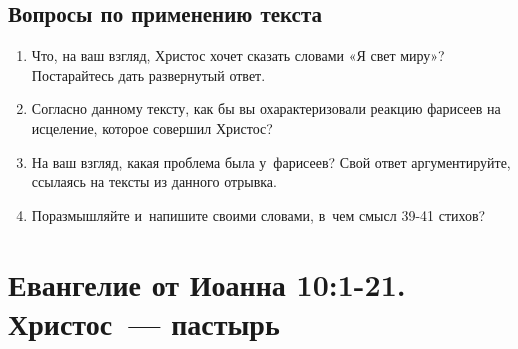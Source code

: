 \documentclass[a4paper,12pt]{article}
\begin{document}
\subsection*{Вопросы по применению текста} 
\begin{enumerate}
    \item Что, на ваш взгляд, Христос хочет сказать словами «Я свет миру»? Постарайтесь дать развернутый ответ.
    
    \myline
    
    \myline
    \item Согласно данному тексту, как бы вы охарактеризовали реакцию фарисеев на исцеление, которое совершил Христос? 
    
    \myline
    
    \myline
    \item На ваш взгляд, какая проблема была у~фарисеев? Свой ответ аргументируйте, ссылаясь на тексты из данного отрывка. 
    
    \myline
    
    \myline
    \item Поразмышляйте и~напишите своими словами, в~чем смысл 39-41 стихов?
    
    \myline
    
    \myline
\end{enumerate}


\section{Евангелие от Иоанна 10:1-21. Христос~--- пастырь}
\end{document}
